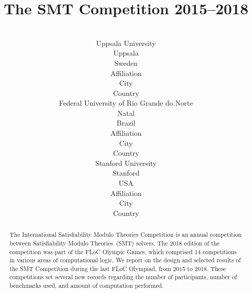 \documentclass[twoside,11pt]{article}
\begin{document}
\title{The SMT Competition 2015--2018}

\author{%
   \\
  \addr Uppsala University \\
  Uppsala \\
  Sweden
  \AND
   \\
  \addr Affiliation \\
  City \\
  Country
  \AND
   \\
  \addr Federal University of Rio Grande do Norte \\
  Natal \\
  Brazil
  \AND
   \\
  \addr Affiliation \\
  City \\
  Country
  \AND
   \\
  \addr Stanford University\\
  Stanford \\
  USA
  \AND
   \\
  \addr Affiliation \\
  City \\
  Country}

\maketitle


\begin{abstract}
  The International Satisfiability Modulo Theories Competition is an
  annual competition between Satisfiability Modulo Theories~(SMT)
  solvers.  The 2018 edition of the competition was part of the FLoC
  Olympic Games, which comprised 14 competitions in various areas of
  computational logic.  We report on the design and selected results
  of the SMT Competition during the last FLoC Olympiad, from 2015 to
  2018.  These competitions set several new records regarding the
  number of participants, number of benchmarks used, and amount of
  computation performed.
\end{abstract}
\end{document}
